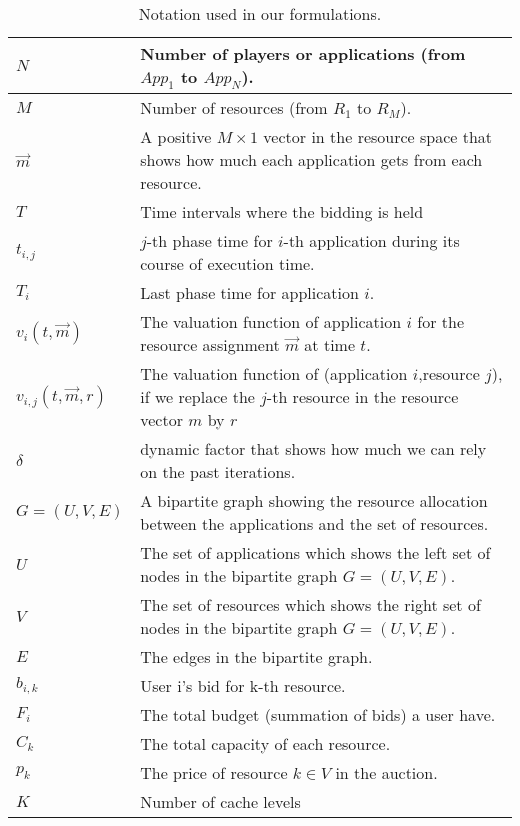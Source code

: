 \begin{table}[!tb] \scriptsize
\centering
\caption{Notation used in our formulations.}\label{Table:notation}
\begin{tabular}{|p{0.7in}|p{2.3in}|} 
\hline $N$ & Number of players or applications (from $App_1$ to $App_N$). \\
\hline $M$ & Number of resources (from $R_1$ to $R_M$). \\
\hline $\vec{m}$ & A positive $M\times 1$ vector in the resource space that shows how much each application gets from each resource. \\   %
\hline $T$ & Time intervals where the bidding is held \\
\hline $t_{i,j}$ & $j$-th phase time for $i$-th application during its course of execution time. \\ 
\hline $T_i$ & Last phase time for application $i$. \\
\hline $v_{i}(t,\vec{m})$ & The valuation function of application $i$ for the resource assignment $\vec{m}$ at time $t$. \\
\hline $v_{i,j}(t,\vec{m},r)$ & The valuation function of (application $i$,resource $j$), if we replace the $j$-th resource in the resource vector $m$ by $r$ \\
\hline $\delta$ & dynamic factor that shows how much we can rely on the past iterations. \\
\hline $G=(U,V,E)$ & A bipartite graph showing the resource allocation between the applications and the set of resources. \\
\hline $U$ & The set of applications which shows the left set of nodes in the bipartite graph $G=(U,V,E)$. \\
\hline $V$ & The set of resources which shows the right set of nodes in the bipartite graph $G=(U,V,E)$. \\
\hline $E$ & The edges in the bipartite graph. \\
\hline $b_{i,k}$ & User i's bid for k-th resource. \\
\hline $F_i$ & The total budget (summation of bids) a user have. \\
\hline $C_k$ & The total capacity of each resource. \\
\hline $p_{k}$ & The price of resource $k \in V$ in the auction. \\
\hline $K$ & Number of cache levels \\
\hline
\end{tabular}
\vspace{-1.0\baselineskip}
\end{table}
